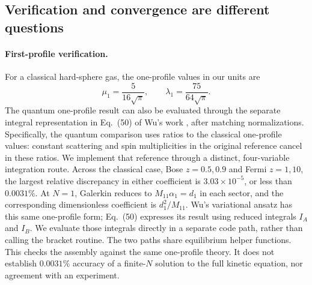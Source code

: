 \subsection{Verification and convergence are different questions}
\paragraph{First-profile verification.}
For a classical hard-sphere gas, the one-profile values in our units are
\begin{equation}
 \mu_1=\frac5{16\sqrt\pi},\qquad
 \lambda_1=\frac{75}{64\sqrt\pi}.
 \label{qt:classicalbenchmark}
\end{equation}
The quantum one-profile result can also be evaluated through the separate
integral representation in Eq.~(50) of Wu's work \cite{qtWu}, after matching
normalizations. Specifically, the quantum comparison uses ratios to the
classical one-profile values: constant scattering and spin multiplicities
in the original reference cancel in these ratios. We implement that reference
through a distinct, four-variable integration route. Across the classical
case, Bose $z=0.5,0.9$ and Fermi
$z=1,10$, the largest relative discrepancy in either coefficient is
$3.03\times10^{-5}$, or less than $0.0031\%$.
At $N=1$, Galerkin reduces to $M_{11}\alpha_1=d_1$ in each sector,
and the corresponding dimensionless coefficient is $d_1^2/M_{11}$.
Wu's variational ansatz has this same one-profile form; Eq.~(50) expresses
its result using reduced integrals $I_A$ and $I_B$. We evaluate those
integrals directly in a separate code path, rather than calling the bracket
routine. The two paths share equilibrium helper functions. This checks the
assembly against the same one-profile theory. It does not
establish $0.0031\%$ accuracy of a finite-$N$ solution to the full kinetic
equation, nor agreement with an experiment.

